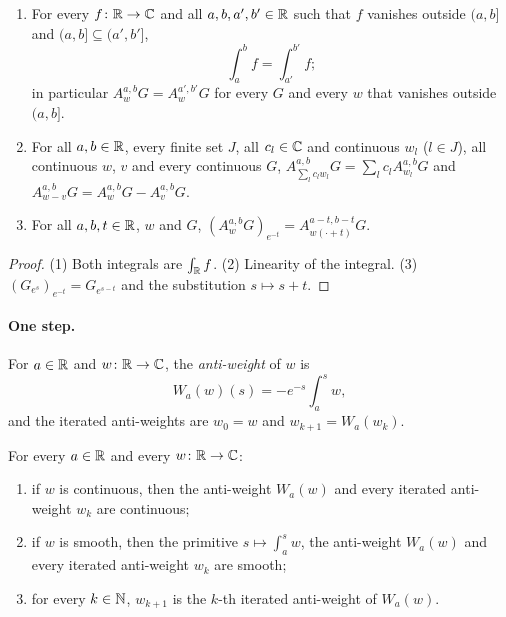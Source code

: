 \begin{lemma}
\label{lem:weighted-dilation-algebra}
\leanok
{}
\begin{enumerate}
  \item For every $f \colon \mathbb{R} \to \mathbb{C}$ and all $a, b, a', b' \in \mathbb{R}$ such that $f$ vanishes
    outside $(a, b]$ and $(a, b] \subseteq (a', b']$,
    \[
      \int_a^b f = \int_{a'}^{b'} f ;
    \]
    in particular $A^{a,b}_w G = A^{a',b'}_w G$ for every $G$ and every $w$ that vanishes
    outside $(a, b]$.
  \item For all $a, b \in \mathbb{R}$, every finite set $J$, all $c_l \in \mathbb{C}$ and continuous $w_l$
    ($l \in J$), all continuous $w$, $v$ and every continuous $G$,
    $A^{a,b}_{\sum_l c_l w_l} G = \sum_l c_l A^{a,b}_{w_l} G$ and
    $A^{a,b}_{w - v} G = A^{a,b}_w G - A^{a,b}_v G$.
  \item For all $a, b, t \in \mathbb{R}$, $w$ and $G$,
    $(A^{a,b}_w G)_{e^{-t}} = A^{a-t, b-t}_{w(\cdot + t)} G$.
\end{enumerate}
\end{lemma}

\begin{proof}
\leanok
(1) Both integrals are $\int_{\mathbb{R}} f$. (2) Linearity of the integral. (3)
$(G_{e^s})_{e^{-t}} = G_{e^{s-t}}$ and the substitution $s \mapsto s + t$.
\end{proof}

\paragraph{One step.}

\begin{definition}
\label{def:anti-weight}
\leanok
For $a \in \mathbb{R}$ and $w \colon \mathbb{R} \to \mathbb{C}$, the \emph{anti-weight} of $w$ is
\[
  W_a(w)(s) = -e^{-s} \int_a^s w ,
\]
and the iterated anti-weights are $w_0 = w$ and $w_{k+1} = W_a(w_k)$.
\end{definition}

\begin{lemma}
\label{lem:anti-weight}
\leanok
{}
For every $a \in \mathbb{R}$ and every $w \colon \mathbb{R} \to \mathbb{C}$:
\begin{enumerate}
  \item if $w$ is continuous, then the anti-weight $W_a(w)$ and every iterated anti-weight $w_k$
    are continuous;
  \item if $w$ is smooth, then the primitive $s \mapsto \int_a^s w$, the anti-weight $W_a(w)$ and
    every iterated anti-weight $w_k$ are smooth;
  \item for every $k \in \mathbb{N}$, $w_{k+1}$ is the $k$-th iterated anti-weight of $W_a(w)$.
\end{enumerate}
\end{lemma}

